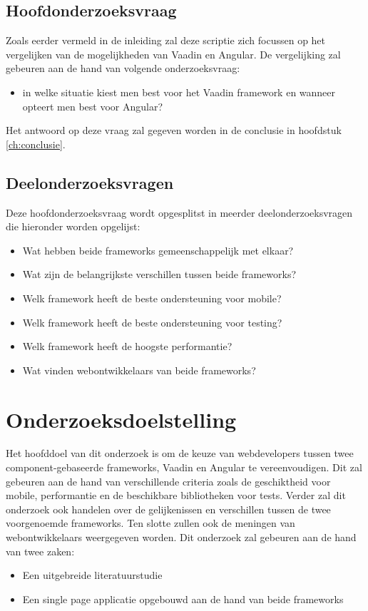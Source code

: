 \subsection{Hoofdonderzoeksvraag}
Zoals eerder vermeld in de inleiding zal deze scriptie zich focussen op het vergelijken van de mogelijkheden van Vaadin en Angular. De vergelijking zal gebeuren aan de hand van volgende onderzoeksvraag:
\begin{itemize}
	\item in welke situatie kiest men best voor het Vaadin framework en wanneer opteert men best voor Angular?
\end{itemize}
Het antwoord op deze vraag zal gegeven worden in de conclusie in hoofdstuk \ref*{ch:conclusie}.

\subsection{Deelonderzoeksvragen}
Deze hoofdonderzoeksvraag wordt opgesplitst in meerder deelonderzoeksvragen die hieronder worden opgelijst:
\begin{itemize}
	\item Wat hebben beide frameworks gemeenschappelijk met elkaar?
	\item Wat zijn de belangrijkste verschillen tussen beide frameworks?
	\item Welk framework heeft de beste ondersteuning voor mobile?
	\item Welk framework heeft de beste ondersteuning voor testing?
	\item Welk framework heeft de hoogste performantie?
	\item Wat vinden webontwikkelaars van beide frameworks?
\end{itemize}

\section{Onderzoeksdoelstelling}
\label{sec:onderzoeksdoelstelling}

Het hoofddoel van dit onderzoek is om de keuze van webdevelopers tussen twee component-gebaseerde frameworks, Vaadin en Angular te vereenvoudigen. 
Dit zal gebeuren aan de hand van verschillende criteria zoals de geschiktheid voor mobile, performantie en de beschikbare bibliotheken voor tests. Verder zal dit onderzoek ook handelen over de gelijkenissen en verschillen tussen de twee voorgenoemde frameworks. 
Ten slotte zullen ook de meningen van webontwikkelaars weergegeven worden.
Dit onderzoek zal gebeuren aan de hand van twee zaken:
\begin{itemize}
	\item Een uitgebreide literatuurstudie
	\item Een single page applicatie opgebouwd aan de hand van beide frameworks
	
\end{itemize}

